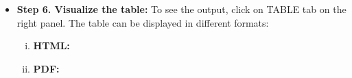 \documentclass[11pt]{article}
\begin{document}
\begin{itemize}
\newpage	
\item {\bf Step 6. Visualize the table:} To see the output, click on TABLE tab on the right panel. The table can be displayed in different formats:

	\begin{enumerate}[i)]
	\item {\bf HTML:}
\begin{center}
\end{center}

    \vspace{0.5cm}
	\item {\bf PDF:}
\begin{center}
\end{center}


\end{enumerate}
\end{itemize}
\end{document}

